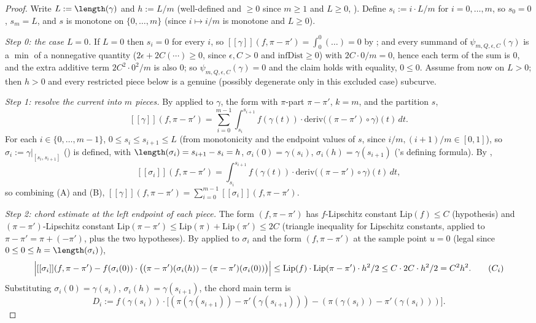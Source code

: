 \begin{proof}
  Write $L := \length(\gamma)$ and $h := L/m$ (well-defined and $\ge 0$ since $m \ge 1$ and
  $L \ge 0$, ). Define $s_i := i \cdot L/m$ for $i=0,\dots,m$, so $s_0=0$, $s_m=L$,
  and $s$ is monotone on $\{0,\dots,m\}$ (since $i \mapsto i/m$ is monotone and $L \ge 0$).

  \emph{Step 0: the case $L=0$.} If $L=0$ then $s_i=0$ for every $i$, so $[[\gamma]](f,\pi-\pi') =
  \int_0^0(\dots) = 0$ by ; and every summand of $\psi_{m,Q,\epsilon,C}(\gamma)$
  is a $\min$ of a nonnegative quantity ($2\epsilon+2C(\cdots) \ge 0$, since $\epsilon,C>0$ and
  $\mathrm{infDist} \ge 0$) with $2C\cdot 0/m=0$, hence each term of the sum is $0$, and the extra
  additive term $2C^2\cdot0^2/m$ is also $0$; so $\psi_{m,Q,\epsilon,C}(\gamma)=0$ and the claim
  holds with equality, $0 \le 0$. Assume from now on $L>0$; then $h>0$ and every restricted piece
  below is a genuine (possibly degenerate only in this excluded case) subcurve.

  \emph{Step 1: resolve the current into $m$ pieces.} By 
  applied to $\gamma$, the form with $\pi$-part $\pi-\pi'$, $k=m$, and the partition $s$,
  \[
    [[\gamma]](f,\pi-\pi') = \sum_{i=0}^{m-1} \int_{s_i}^{s_{i+1}} f(\gamma(t)) \cdot
      \mathrm{deriv}\bigl((\pi-\pi')\circ\gamma\bigr)(t)\,dt
    . \tag{A}
  \]
  For each $i \in \{0,\dots,m-1\}$, $0 \le s_i \le s_{i+1} \le L$ (from monotonicity and the
  endpoint values of $s$, since $i/m,(i+1)/m \in [0,1]$), so $\sigma_i := \gamma|_{[s_i,s_{i+1}]}$
  () is defined, with $\length(\sigma_i)=s_{i+1}-s_i=h$,
  $\sigma_i(0)=\gamma(s_i)$, $\sigma_i(h)=\gamma(s_{i+1})$ ('s defining
  formula). By ,
  \[
    [[\sigma_i]](f,\pi-\pi') = \int_{s_i}^{s_{i+1}} f(\gamma(t)) \cdot
      \mathrm{deriv}\bigl((\pi-\pi')\circ\gamma\bigr)(t)\,dt
    , \tag{B}
  \]
  so combining (A) and (B), $[[\gamma]](f,\pi-\pi') = \sum_{i=0}^{m-1}[[\sigma_i]](f,\pi-\pi')$.

  \emph{Step 2: chord estimate at the left endpoint of each piece.} The form $(f,\pi-\pi')$ has
  $f$-Lipschitz constant $\mathrm{Lip}(f) \le C$ (hypothesis) and $(\pi-\pi')$-Lipschitz constant
  $\mathrm{Lip}(\pi-\pi') \le \mathrm{Lip}(\pi)+\mathrm{Lip}(\pi') \le 2C$ (triangle inequality for
  Lipschitz constants, applied to $\pi-\pi' = \pi + (-\pi')$, plus the two hypotheses). By
   applied to $\sigma_i$ and the form $(f,\pi-\pi')$ at the sample
  point $u=0$ (legal since $0 \le 0 \le h = \length(\sigma_i)$),
  \[
    \Bigl| [[\sigma_i]](f,\pi-\pi') - f(\sigma_i(0)) \cdot
      \bigl((\pi-\pi')(\sigma_i(h)) - (\pi-\pi')(\sigma_i(0))\bigr) \Bigr|
      \le \mathrm{Lip}(f)\cdot\mathrm{Lip}(\pi-\pi')\cdot h^2/2 \le C \cdot 2C \cdot h^2/2 = C^2h^2
    . \tag{$C_i$}
  \]
  Substituting $\sigma_i(0)=\gamma(s_i)$, $\sigma_i(h)=\gamma(s_{i+1})$, the chord main term is
  \[
    D_i := f(\gamma(s_i)) \cdot
      \bigl[ (\pi(\gamma(s_{i+1}))-\pi'(\gamma(s_{i+1}))) - (\pi(\gamma(s_i))-\pi'(\gamma(s_i))) \bigr]
    .
  \]


\end{proof}
